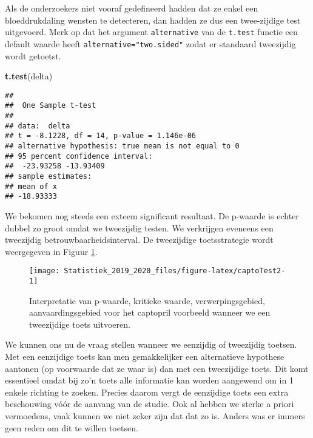 \documentclass[12pt,dutch,coursenotes]{book}
\newenvironment{Shaded}{\begin{snugshade}}{\end{snugshade}}
\newcommand{\KeywordTok}[1]{\textcolor[rgb]{0.13,0.29,0.53}{\textbf{#1}}}
\newcommand{\NormalTok}[1]{#1}
\theoremstyle{definition}
\theoremstyle{definition}
\theoremstyle{definition}
\theoremstyle{remark}
\begin{document}
Als de onderzoekers niet vooraf gedefineerd hadden dat ze enkel een
bloeddrukdaling wensten te detecteren, dan hadden ze dus een
twee-zijdige test uitgevoerd. Merk op dat het argument
\texttt{alternative} van de \texttt{t.test} functie een default waarde
heeft \texttt{alternative="two.sided"} zodat er standaard tweezijdig
wordt getoetst.

\begin{Shaded}
\begin{Highlighting}[]
\KeywordTok{t.test}\NormalTok{(delta)}
\end{Highlighting}
\end{Shaded}

\begin{verbatim}
## 
##  One Sample t-test
## 
## data:  delta
## t = -8.1228, df = 14, p-value = 1.146e-06
## alternative hypothesis: true mean is not equal to 0
## 95 percent confidence interval:
##  -23.93258 -13.93409
## sample estimates:
## mean of x 
## -18.93333
\end{verbatim}

We bekomen nog steeds een exteem significant resultaat. De p-waarde is
echter dubbel zo groot omdat we tweezijdig testen. We verkrijgen
eveneens een tweezijdig betrouwbaarheidsinterval. De tweezijdige
toetsstrategie wordt weergegeven in Figuur \ref{fig:captoTest2}.

\begin{figure}

{\centering \texttt{[image: Statistiek\_2019\_2020\_files/figure-latex/captoTest2-1]} 

}

\caption{Interpretatie van p-waarde, kritieke waarde, verwerpingsgebied, aanvaardingsgebied voor het captopril voorbeeld wanneer we een tweezijdige toets uitvoeren.}\label{fig:captoTest2}
\end{figure}

We kunnen ons nu de vraag stellen wanneer we eenzijdig of tweezijdig
toetsen. Met een eenzijdige toets kan men gemakkelijker een alternatieve
hypothese aantonen (op voorwaarde dat ze waar is) dan met een
tweezijdige toets. Dit komt essentieel omdat bij zo'n toets alle
informatie kan worden aangewend om in 1 enkele richting te zoeken.
Precies daarom vergt de eenzijdige toets een extra beschouwing vóór de
aanvang van de studie. Ook al hebben we sterke a priori vermoedens, vaak
kunnen we niet zeker zijn dat dat zo is. Anders was er immers geen reden
om dit te willen toetsen.
\end{document}
